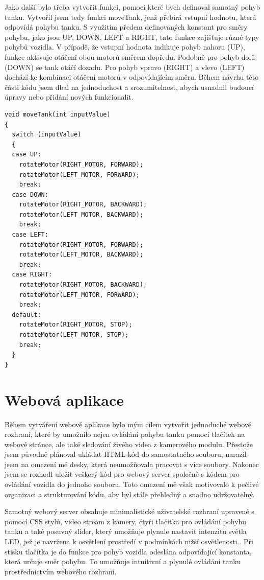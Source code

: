 \documentclass[12pt, a4paper,
oneside
openany
]{report}
\begin{document}
\noindent Jako další bylo třeba vytvořit funkci, pomocí které bych definoval samotný pohyb tanku. Vytvořil jsem tedy funkci moveTank, jenž přebírá vstupní hodnotu, která odpovídá pohybu tanku. S využitím předem definovaných konstant pro směry pohybu, jako jsou UP, DOWN, LEFT a RIGHT, tato funkce zajišťuje různé typy pohybů vozidla. V případě, že vstupní hodnota indikuje pohyb nahoru (UP), funkce aktivuje otáčení obou motorů směrem dopředu. Podobně pro pohyb dolů (DOWN) se tank otáčí dozadu. Pro pohyb vpravo (RIGHT) a vlevo (LEFT) dochází ke kombinaci otáčení motorů v odpovídajícím směru. Během návrhu této části kódu jsem dbal na jednoduchost a srozumitelnost, abych usnadnil budoucí úpravy nebo přidání nových funkcionalit.

\vspace*{0.05\textheight}

\begin{lstlisting}[style=arduinoStyle]
void moveTank(int inputValue)
{
  switch (inputValue)
  {
  case UP:
    rotateMotor(RIGHT_MOTOR, FORWARD);
    rotateMotor(LEFT_MOTOR, FORWARD);
    break;
  case DOWN:
    rotateMotor(RIGHT_MOTOR, BACKWARD);
    rotateMotor(LEFT_MOTOR, BACKWARD);
    break;
  case LEFT:
    rotateMotor(RIGHT_MOTOR, FORWARD);
    rotateMotor(LEFT_MOTOR, BACKWARD);
    break;
  case RIGHT:
    rotateMotor(RIGHT_MOTOR, BACKWARD);
    rotateMotor(LEFT_MOTOR, FORWARD);
    break;
  default:
    rotateMotor(RIGHT_MOTOR, STOP);
    rotateMotor(LEFT_MOTOR, STOP);
    break;
  }
}
\end{lstlisting}

 
 
 \section{Webová aplikace}
\noindent Během vytváření webové aplikace bylo mým cílem vytvořit jednoduché webové rozhraní, které by umožnilo nejen ovládání pohybu tanku pomocí tlačítek na webové stránce, ale také sledování živého videa z kamerového modulu. Přestože jsem původně plánoval ukládat HTML kód do samostatného souboru, narazil jsem na omezení mé desky, která neumožňovala pracovat s více soubory. Nakonec jsem se rozhodl uložit veškerý kód pro webový server společně s kódem pro ovládání vozidla do jednoho souboru. Toto omezení mě však motivovalo k pečlivé organizaci a strukturování kódu, aby byl stále přehledný a snadno udržovatelný. 

\noindent Samotný webový server obsahuje minimalistické uživatelské rozhraní upravené s pomocí CSS stylů, video stream z kamery, čtyři tlačítka pro ovládání pohybu tanku a také posuvný slider, který umožňuje plynule nastavit intenzitu světla LED, jež je navržena k osvětlení prostředí v podmínkách nižší osvětlenosti.. Při stisku tlačítka je do funkce pro pohyb vozidla odeslána odpovídající konstanta, která určuje směr pohybu. To umožňuje intuitivní a plynulé ovládání tanku prostřednictvím webového rozhraní.
 
\end{document}
